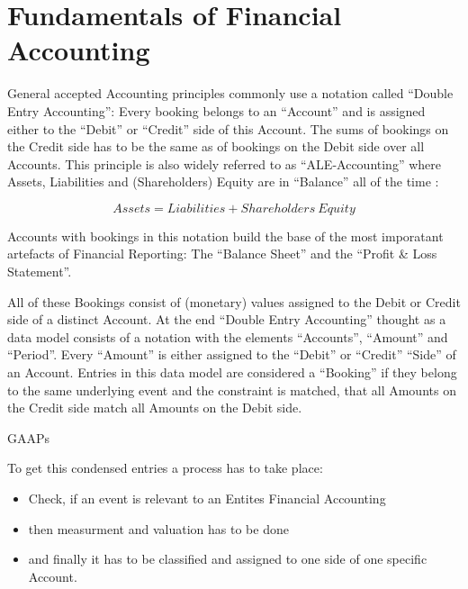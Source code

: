 \chapter{Fundamentals of Financial Accounting}\label{chap:Accounting}

General accepted Accounting principles commonly use a notation called \enquote{Double Entry Accounting}:
Every booking belongs to an \enquote{Account} and is assigned either to the \enquote{Debit} or \enquote{Credit} side of this Account.
The sums of bookings on the Credit side has to be the same as of bookings on the Debit side over all Accounts.
This principle is also widely referred to as \enquote{ALE-Accounting} where Assets, Liabilities and (Shareholders) Equity are in \enquote{Balance} all of the time :

\[ Assets = Liabilities + Shareholders\ Equity\]

Accounts with bookings in this notation build the base of the most imporatant artefacts of Financial Reporting:
The \enquote{Balance Sheet} and the \enquote{Profit \& Loss Statement}.

All of these Bookings consist of (monetary) values assigned to the Debit or Credit side of a distinct Account.
At the end \enquote{Double Entry Accounting} thought as a data model consists of a notation with the elements \enquote{Accounts}, \enquote{Amount} and \enquote{Period}.
Every \enquote{Amount} is either assigned to the \enquote{Debit} or \enquote{Credit} \enquote{Side} of an Account.
Entries in this data model are considered a \enquote{Booking} if they belong to the same underlying event and the constraint is matched, that all Amounts on the Credit side match all Amounts on the Debit side.

GAAPs 



To get this condensed entries a process has to take place:
\begin{itemize}
	\item Check, if an event is relevant to an Entites Financial Accounting
	\item then measurment and valuation has to be done
	\item and finally it has to be classified and assigned to one side of one specific Account.
\end{itemize}

